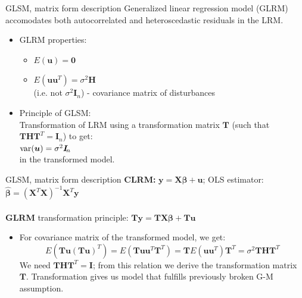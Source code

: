 \documentclass{beamer}
\begin{document}
\begin{frame}{GLSM, matrix form description}
Generalized linear regression model (GLRM) accomodates both autocorrelated and heteroscedastic residuals in the LRM.\\ \medskip
\begin{itemize}
\item GLRM properties:
\begin{itemize}
\item $E(\boldsymbol{u})=\boldsymbol{0}$
\item $E(\boldsymbol{uu}^T)=\sigma^2\boldsymbol{H}$ \\ (i.e. not $\sigma^2 \boldsymbol{I}_{\! n}$) - covariance matrix of disturbances
\end{itemize}
\vspace{0.5cm}
\item Principle of GLSM: \\Transformation of LRM using a transformation matrix $\boldsymbol{T}$ (such that $\bm{THT}^{T}=\bm{I}_n$) to get: \\ \medskip
$\textnormal{var}(\boldsymbol{u}) = \sigma^2 \boldsymbol{I}_{\! n}$ \\ \medskip
in the transformed model.
\end{itemize}
\end{frame}
\begin{frame}{GLSM, matrix form description}
\textbf{CLRM:} \hspace{0.2cm} $\boldsymbol{y}=\boldsymbol{X}\boldsymbol{\beta}+\boldsymbol{u}$; OLS estimator: $\boldsymbol{\hat{\beta}}=(\boldsymbol{X}^T\boldsymbol{X})^{-1}\boldsymbol{X}^T\boldsymbol{y}$ \\
~\\
\textbf{GLRM} transformation principle:  $\boldsymbol{T}\boldsymbol{y}=\boldsymbol{TX}\boldsymbol{\beta}+\boldsymbol{T}\boldsymbol{u}$\\ \medskip
\begin{itemize}
\item For covariance matrix of the transformed model, we get:
$$E(\boldsymbol{T}\boldsymbol{u}(\boldsymbol{T}\boldsymbol{u})^T)=
E(\boldsymbol{T}\boldsymbol{u}\boldsymbol{u}^T\boldsymbol{T}^T)=\boldsymbol{T} E(\boldsymbol{u}\boldsymbol{u}^T)\boldsymbol{T}^T=\sigma^2\boldsymbol{THT}^T$$
We need $\boldsymbol{THT}^T \! = \boldsymbol{I}$; from this relation we derive the transformation matrix $\boldsymbol{T}$.
Transformation gives us model that fulfills previously broken G-M assumption.
\end{itemize}
\end{frame}
\end{document}
